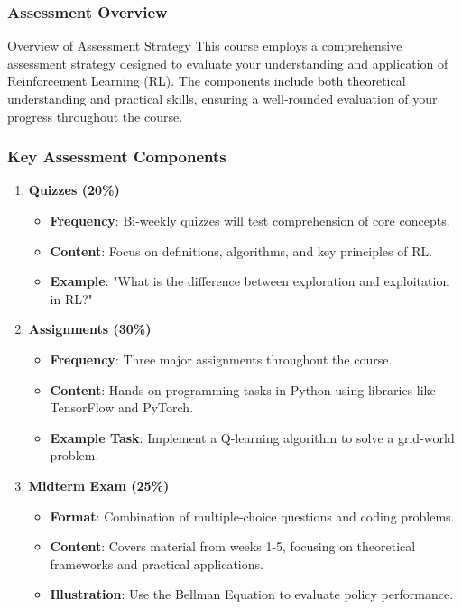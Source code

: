 \documentclass[aspectratio=169]{beamer}
\begin{document}
\begin{frame}[fragile]
    \frametitle{Assessment Overview}
    \begin{block}{Overview of Assessment Strategy}
        This course employs a comprehensive assessment strategy designed to evaluate your understanding and application of Reinforcement Learning (RL). The components include both theoretical understanding and practical skills, ensuring a well-rounded evaluation of your progress throughout the course.
    \end{block}
\end{frame}

\begin{frame}[fragile]
    \frametitle{Key Assessment Components}
    \begin{enumerate}
        \item \textbf{Quizzes (20\%)}
        \begin{itemize}
            \item \textbf{Frequency}: Bi-weekly quizzes will test comprehension of core concepts.
            \item \textbf{Content}: Focus on definitions, algorithms, and key principles of RL.
            \item \textbf{Example}: "What is the difference between exploration and exploitation in RL?"
        \end{itemize}
        
        \item \textbf{Assignments (30\%)}
        \begin{itemize}
            \item \textbf{Frequency}: Three major assignments throughout the course.
            \item \textbf{Content}: Hands-on programming tasks in Python using libraries like TensorFlow and PyTorch.
            \item \textbf{Example Task}: Implement a Q-learning algorithm to solve a grid-world problem.
        \end{itemize}

        \item \textbf{Midterm Exam (25\%)}
        \begin{itemize}
            \item \textbf{Format}: Combination of multiple-choice questions and coding problems.
            \item \textbf{Content}: Covers material from weeks 1-5, focusing on theoretical frameworks and practical applications.
            \item \textbf{Illustration}: Use the Bellman Equation to evaluate policy performance.
        \end{itemize}


\end{enumerate}
\end{frame}
\end{document}
